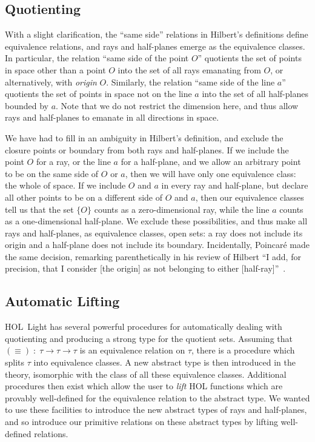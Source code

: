 \subsection{Quotienting}\label{sec:RayQuotienting}
With a slight clarification, the ``same side'' relations in Hilbert's definitions define equivalence relations, and rays and half-planes emerge as the equivalence classes. In particular, the relation ``same side of the point $O$'' quotients the set of points in space other than a point $O$ into the set of all rays emanating from $O$, or alternatively, with \emph{origin} $O$. Similarly, the relation ``same side of the line $a$'' quotients the set of points in space not on the line $a$ into the set of all half-planes bounded by $a$. Note that we do not restrict the dimension here, and thus allow rays and half-planes to emanate in all directions in space.

We have had to fill in an ambiguity in Hilbert's definition, and exclude the closure points or boundary from both rays and half-planes. If we include the point $O$ for a ray, or the line $a$ for a half-plane, and we allow an arbitrary point to be on the same side of $O$ or $a$, then we will have only one equivalence class: the whole of space. If we include $O$ and $a$ in every ray and half-plane, but declare all other points to be on a different side of $O$ and $a$, then our equivalence classes tell us that the set $\{O\}$ counts as a zero-dimensional ray, while the line $a$ counts as a one-dimensional half-plane. We exclude these possibilities, and thus make all rays and half-planes, as equivalence classes, open sets: a ray does not include its origin and a half-plane does not include its boundary. Incidentally, Poincar\'{e} made the same decision, remarking parenthetically in his review of Hilbert ``I add, for precision, that I consider [the origin] as not belonging to either [half-ray]''~\cite[p. 11]{PoincareReview}.

\subsection{Automatic Lifting}
HOL~Light has several powerful procedures for automatically dealing with quotienting and producing a strong type for the quotient sets. Assuming that $(\equiv)\;:\;\tau\rightarrow \tau \rightarrow \tau$ is an equivalence relation on $\tau$, there is a procedure which splits $\tau$ into equivalence classes. A new abstract type is then introduced in the theory, isomorphic with the class of all these equivalence classes. Additional procedures then exist which allow the user to \emph{lift} HOL functions which are provably well-defined for the equivalence relation to the abstract type. We wanted to use these facilities to introduce the new abstract types of rays and half-planes, and so introduce our primitive relations on these abstract types by lifting well-defined relations. 

